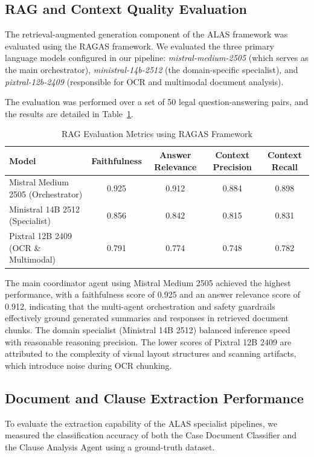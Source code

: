 \subsection{RAG and Context Quality Evaluation}
The retrieval-augmented generation component of the ALAS framework was evaluated using the RAGAS framework. We evaluated the three primary language models configured in our pipeline: \emph{mistral-medium-2505} (which serves as the main orchestrator), \emph{ministral-14b-2512} (the domain-specific specialist), and \emph{pixtral-12b-2409} (responsible for OCR and multimodal document analysis). 

The evaluation was performed over a set of 50 legal question-answering pairs, and the results are detailed in Table~\ref{tab:rag_evaluation}.

\begin{table}[htbp]
\centering
\caption{RAG Evaluation Metrics using RAGAS Framework}
\label{tab:rag_evaluation}
\begin{tabular}{lcccc}
\hline
\textbf{Model} & \textbf{Faithfulness} & \textbf{Answer Relevance} & \textbf{Context Precision} & \textbf{Context Recall} \\ \hline
Mistral Medium 2505 (Orchestrator) & 0.925 & 0.912 & 0.884 & 0.898 \\
Ministral 14B 2512 (Specialist) & 0.856 & 0.842 & 0.815 & 0.831 \\
Pixtral 12B 2409 (OCR \& Multimodal) & 0.791 & 0.774 & 0.748 & 0.782 \\ \hline
\end{tabular}
\end{table}

The main coordinator agent using Mistral Medium 2505 achieved the highest performance, with a faithfulness score of 0.925 and an answer relevance score of 0.912, indicating that the multi-agent orchestration and safety guardrails effectively ground generated summaries and responses in retrieved document chunks. The domain specialist (Ministral 14B 2512) balanced inference speed with reasonable reasoning precision. The lower scores of Pixtral 12B 2409 are attributed to the complexity of visual layout structures and scanning artifacts, which introduce noise during OCR chunking.

\subsection{Document and Clause Extraction Performance}
To evaluate the extraction capability of the ALAS specialist pipelines, we measured the classification accuracy of both the Case Document Classifier and the Clause Analysis Agent using a ground-truth dataset. 

